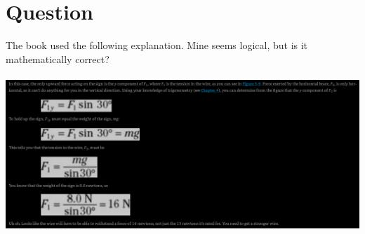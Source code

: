 \documentclass{article}
\begin{document}
\section{Question}
The book used the following explanation. Mine seems logical, but is it mathematically correct?
\\\\
\includegraphics[width=\columnwidth]{image2}
\end{document}
